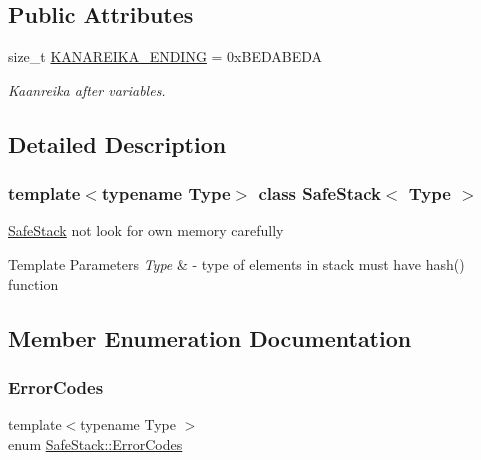 \subsection*{Public Attributes}
\begin{DoxyCompactItemize}
\item 
\mbox{\label{classSafeStack_ac2a2301af942ea33d7c8ca4f3740fd2e}} 
size\+\_\+t \hyperlink{classSafeStack_ac2a2301af942ea33d7c8ca4f3740fd2e}{K\+A\+N\+A\+R\+E\+I\+K\+A\+\_\+\+E\+N\+D\+I\+NG} = 0x\+B\+E\+D\+A\+B\+E\+DA
\begin{DoxyCompactList}\small\item\em Kaanreika after variables. \end{DoxyCompactList}\end{DoxyCompactItemize}


\subsection{Detailed Description}
\subsubsection*{template$<$typename Type$>$\newline
class Safe\+Stack$<$ Type $>$}

\hyperlink{classSafeStack}{Safe\+Stack} not look for own memory carefully 
\begin{DoxyTemplParams}{Template Parameters}
{\em Type} & -\/ type of elements in stack must have hash() function \\
\hline
\end{DoxyTemplParams}


\subsection{Member Enumeration Documentation}
\mbox{\label{classSafeStack_a3a6ee072918bd0a2c09fa0ea12c1ab64}} 
\subsubsection{\texorpdfstring{Error\+Codes}{ErrorCodes}}
{\footnotesize\ttfamily template$<$typename Type $>$ \\
enum \hyperlink{classSafeStack_a3a6ee072918bd0a2c09fa0ea12c1ab64}{Safe\+Stack\+::\+Error\+Codes}}

